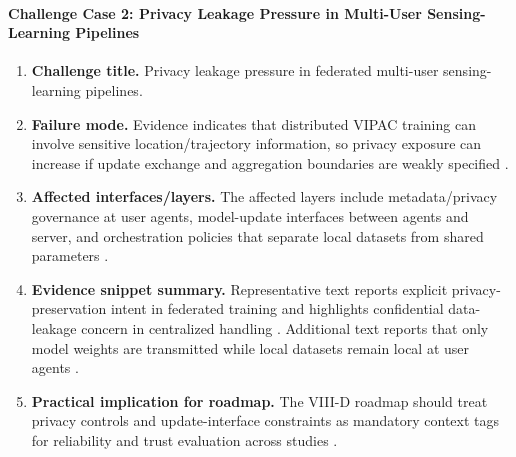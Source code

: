 \documentclass[lettersize,journal]{IEEEtran}
\begin{document}
\paragraph{Challenge Case 2: Privacy Leakage Pressure in Multi-User Sensing-Learning Pipelines}
\begin{enumerate}
    \item \textbf{Challenge title.} Privacy leakage pressure in federated multi-user sensing-learning pipelines.
    \item \textbf{Failure mode.} Evidence indicates that distributed VIPAC training can involve sensitive location/trajectory information, so privacy exposure can increase if update exchange and aggregation boundaries are weakly specified \cite{O_ISAC_039}.
    \item \textbf{Affected interfaces/layers.} The affected layers include metadata/privacy governance at user agents, model-update interfaces between agents and server, and orchestration policies that separate local datasets from shared parameters \cite{O_ISAC_039}.
    \item \textbf{Evidence snippet summary.} Representative text reports explicit privacy-preservation intent in federated training and highlights confidential data-leakage concern in centralized handling \cite{O_ISAC_039}. Additional text reports that only model weights are transmitted while local datasets remain local at user agents \cite{O_ISAC_039}.
    \item \textbf{Practical implication for roadmap.} The VIII-D roadmap should treat privacy controls and update-interface constraints as mandatory context tags for reliability and trust evaluation across studies \cite{O_ISAC_039}.
\end{enumerate}
\end{document}
